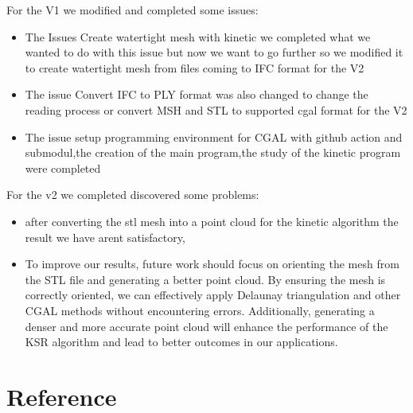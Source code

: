 \documentclass{article}
\begin{document}
For the V1 we modified and completed some issues:
\begin{itemize}
  \item The Issues Create watertight mesh with kinetic we completed what we wanted to do with this issue but now we want to go further so we modified it 
  to create watertight mesh from files coming to IFC format for the V2
  \item The issue Convert IFC to PLY format was also changed to change the reading process or convert MSH and STL to supported cgal format for the V2
  \item The issue setup programming environment for CGAL with github action and submodul,the creation of the main program,the study of the kinetic program were completed 
\end{itemize}

For the v2 we completed discovered some problems:
\begin{itemize}
  \item after converting the stl mesh into a point cloud for the kinetic algorithm the result we have arent satisfactory, 
  \item To improve our results, future work should focus on orienting the mesh from the STL file and generating a better point cloud. By ensuring the mesh is correctly oriented,
        we can effectively apply Delaunay triangulation and other CGAL methods without encountering errors. Additionally, 
        generating a denser and more accurate point cloud will enhance the performance of the KSR algorithm and lead to better outcomes in our applications.
\end{itemize}

\nocite{*}
\section{Reference}


\end{document}
